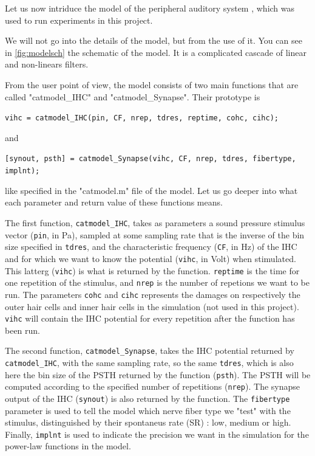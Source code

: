Let us now intriduce the model of the peripheral auditory system
\cite{Model1, Model2, Model3}, which was used to run experiments in this project. 

We will not go into the details of the model, but from the use of it. 
You can see in \autoref{fig:modelsch} the schematic of the model.
It is a complicated cascade of linear and non-linears filters.



From the user point of view, the model consists of two main functions 
that are called "catmodel\_IHC" and "catmodel\_Synapse". Their prototype is

\texttt{vihc = catmodel\_IHC(pin, CF, nrep, tdres, reptime, cohc, cihc);}

and

\texttt{[synout, psth] = catmodel\_Synapse(vihc, CF, nrep, tdres, fibertype, implnt);}

like specified in the "catmodel.m" file of the model. 
Let us go deeper into what each parameter and return value of these functions means.

The first function, \texttt{catmodel\_IHC}, takes as parameters 
a sound pressure stimulus vector (\texttt{pin}, in Pa), sampled at some sampling rate 
that is the inverse of the bin size specified in \texttt{tdres}, and 
the characteristic frequency (\texttt{CF}, in Hz) 
of the IHC and for which we want to know the potential 
(\texttt{vihc}, in Volt) when stimulated. 
This latterg (\texttt{vihc}) is what is returned by the function. 
\texttt{reptime} is the time for one repetition of the stimulus, 
and \texttt{nrep} is the number of repetions we want to be run. 
The parameters \texttt{cohc} and \texttt{cihc} represents the damages on respectively 
the outer hair cells and inner hair cells in the simulation (not used in this project).
\texttt{vihc} will contain the IHC potential for every repetition 
after the function has been run.

The second function, \texttt{catmodel\_Synapse}, 
takes the IHC potential returned by \texttt{catmodel\_IHC}, 
with the same sampling rate, so the same \texttt{tdres}, which is also here the bin size
of the PSTH returned by the function (\texttt{psth}). 
The PSTH will be computed according to the specified number of repetitions (\texttt{nrep}).
The synapse output of the IHC (\texttt{synout}) is also returned by the function.
The \texttt{fibertype} parameter is used to tell the model which nerve fiber type
we "test" with the stimulus, distinguished by their spontaneus rate (SR) : 
low, medium or high. 
Finally, \texttt{implnt} is used to indicate the precision we want in the simulation 
for the power-law functions in the model.

